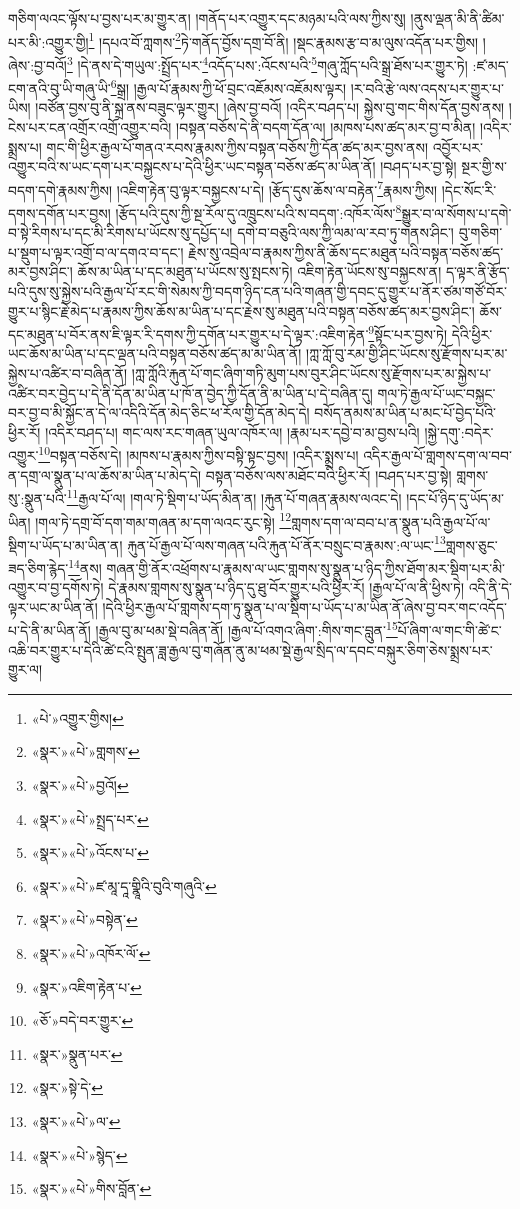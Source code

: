གཅིག་ལའང་ལྟོས་པ་བྱས་པར་མ་གྱུར་ན། །གནོད་པར་འགྱུར་དང་མཉམ་པའི་ལས་ཀྱིས་སུ། །ནུས་ལྡན་མི་ནི་ཚིམ་པར་མི་:འགྱུར་གྱི།\footnote{«པེ་»འགྱུར་གྱིས།} །དཔའ་བོ་ཀླགས་\footnote{«སྣར་»«པེ་»གླགས་}ཏེ་གནོད་བྱོས་དགྲ་བོ་ནི། །སྡང་རྣམས་རྩ་བ་མ་ལུས་འདོན་པར་གྱིས། །ཞེས་:བྱ་བའོ།\footnote{«སྣར་»«པེ་»བྱའོ།} །དེ་ནས་དེ་གཡུལ་:སྤྲོད་པར་\footnote{«སྣར་»«པེ་»སྤྲད་པར་}འདོད་པས་:འོངས་པའི་\footnote{«སྣར་»«པེ་»འོངས་པ་}གཞུ་ཀློད་པའི་སྒྲ་ཐོས་པར་གྱུར་ཏེ། :ཛ་མད་ངག་ནའི་བུ་ཡི་གཞུ་ཡི་\footnote{«སྣར་»«པེ་»ཛ་མཱ་དཱ་གྣཱིའི་བུའི་གཞུའི་}སྒྲ། །རྒྱལ་པོ་རྣམས་ཀྱི་ཕོ་བྲང་འཇོམས་འཇོམས་ལྟར། །ར་བའི་རྩེ་ལས་འདས་པར་གྱུར་པ་ཡིས། །བཙོན་བྱས་བུ་ནི་སྐྲ་ནས་བཟུང་ལྟར་གྱུར། །ཞེས་བྱ་བའོ། །འདིར་བཤད་པ། སྐྱེས་བུ་གང་གིས་དོན་བྱས་ནས། །ངེས་པར་ངན་འགྲོར་འགྲོ་འགྱུར་བའི། །བསྟན་བཅོས་དེ་ནི་བདག་དོན་ལ། །མཁས་པས་ཚད་མར་བྱ་བ་མིན། །འདིར་སྨྲས་པ། གང་གི་ཕྱིར་རྒྱལ་པོ་གནའ་རབས་རྣམས་ཀྱིས་བསྟན་བཅོས་ཀྱི་དོན་ཚད་མར་བྱས་ནས། འབྱོར་པར་འགྱུར་བའི་ས་ཡང་དག་པར་བསྐྱངས་པ་དེའི་ཕྱིར་ཡང་བསྟན་བཅོས་ཚད་མ་ཡིན་ནོ། །བཤད་པར་བྱ་སྟེ། སྔར་གྱི་ས་བདག་དགེ་རྣམས་ཀྱིས། །འཇིག་རྟེན་བུ་ལྟར་བསྐྱངས་པ་དེ། །རྩོད་དུས་ཆོས་ལ་བརྟེན་\footnote{«སྣར་»«པེ་»བསྟེན་}རྣམས་ཀྱིས། །དེང་སོང་རི་དགས་དགོན་པར་བྱས། །རྩོད་པའི་དུས་ཀྱི་སྔ་རོལ་དུ་འཁྲུངས་པའི་ས་བདག་:འཁོར་ལོས་\footnote{«སྣར་»«པེ་»འཁོར་ལོ་}སྒྱུར་བ་ལ་སོགས་པ་དགེ་བ་སྟེ་རིགས་པ་དང་མི་རིགས་པ་ཡོངས་སུ་དཔྱོད་པ། དགེ་བ་བཅུའི་ལས་ཀྱི་ལམ་ལ་རབ་ཏུ་གནས་ཤིང་། བུ་གཅིག་པ་སྡུག་པ་ལྟར་འགྲོ་བ་ལ་དགའ་བ་དང་། རྗེས་སུ་འབྲེལ་བ་རྣམས་ཀྱིས་ནི་ཆོས་དང་མཐུན་པའི་བསྟན་བཅོས་ཚད་མར་བྱས་ཤིང་། ཆོས་མ་ཡིན་པ་དང་མཐུན་པ་ཡོངས་སུ་སྤངས་ཏེ། འཇིག་རྟེན་ཡོངས་སུ་བསྐྱངས་ན། ད་ལྟར་ནི་རྩོད་པའི་དུས་སུ་སྐྱེས་པའི་རྒྱལ་པོ་རང་གི་སེམས་ཀྱི་བདག་ཉིད་ངན་པའི་གཞན་གྱི་དབང་དུ་གྱུར་པ་ནོར་ཙམ་གཙོ་བོར་གྱུར་པ་སྙིང་རྗེ་མེད་པ་རྣམས་ཀྱིས་ཆོས་མ་ཡིན་པ་དང་རྗེས་སུ་མཐུན་པའི་བསྟན་བཅོས་ཚད་མར་བྱས་ཤིང་། ཆོས་དང་མཐུན་པ་བོར་ནས་ཇི་ལྟར་རི་དགས་ཀྱི་དགོན་པར་གྱུར་པ་དེ་ལྟར་:འཇིག་རྟེན་\footnote{«སྣར་»འཇིག་རྟེན་པ་}སྟོང་པར་བྱས་ཏེ། དེའི་ཕྱིར་ཡང་ཆོས་མ་ཡིན་པ་དང་ལྡན་པའི་བསྟན་བཅོས་ཚད་མ་མ་ཡིན་ནོ། །ཀླ་ཀློ་བུ་རམ་གྱི་ཤིང་ཡོངས་སུ་རྫོགས་པར་མ་སྐྱེས་པ་འཚིར་བ་བཞིན་ནོ། །ཀླ་ཀློའི་རྐུན་པོ་གང་ཞིག་གཏི་མུག་པས་བུར་ཤིང་ཡོངས་སུ་རྫོགས་པར་མ་སྐྱེས་པ་འཚིར་བར་བྱེད་པ་དེ་ནི་དོན་མ་ཡིན་པ་ཁོ་ན་བྱེད་ཀྱི་དོན་ནི་མ་ཡིན་པ་དེ་བཞིན་དུ། གལ་ཏེ་རྒྱལ་པོ་ཡང་བསྐྱང་བར་བྱ་བ་མི་སྐྱོང་ན་དེ་ལ་འདིའི་དོན་མེད་ཅིང་ཕ་རོལ་གྱི་དོན་མེད་དེ། བསོད་ནམས་མ་ཡིན་པ་མང་པོ་བྱེད་པའི་ཕྱིར་རོ། །འདིར་བཤད་པ། གང་ལས་རང་གཞན་ཡུལ་འཁོར་ལ། །རྣམ་པར་དབྱེ་བ་མ་བྱས་པའི། །སྐྱེ་དགུ་:བདེར་འགྱུར་\footnote{«ཅོ་»བདེ་བར་གྱུར་}བསྟན་བཅོས་དེ། །མཁས་པ་རྣམས་ཀྱིས་བསྟི་སྟང་བྱས། །འདིར་སྨྲས་པ། འདིར་རྒྱལ་པོ་གླགས་དག་ལ་བབ་ན་དགྲ་ལ་སྣུན་པ་ལ་ཆོས་མ་ཡིན་པ་མེད་དེ། བསྟན་བཅོས་ལས་མཐོང་བའི་ཕྱིར་རོ། །བཤད་པར་བྱ་སྟེ། གླགས་སུ་:སྣུན་པའི་\footnote{«སྣར་»སྣུན་པར་}རྒྱལ་པོ་ལ། །གལ་ཏེ་སྡིག་པ་ཡོད་མིན་ན། །རྐུན་པོ་གཞན་རྣམས་ལའང་དེ། །དང་པོ་ཉིད་དུ་ཡོད་མ་ཡིན། །གལ་ཏེ་དགྲ་བོ་དག་གམ་གཞན་མ་དག་ལའང་རུང་སྟེ། \footnote{«སྣར་»སྟེ་དེ་}གླགས་དག་ལ་བབ་པ་ན་སྣུན་པའི་རྒྱལ་པོ་ལ་སྡིག་པ་ཡོད་པ་མ་ཡིན་ན། རྐུན་པོ་རྒྱལ་པོ་ལས་གཞན་པའི་རྐུན་པོ་ནོར་བསྲུང་བ་རྣམས་:ལ་ཡང་\footnote{«སྣར་»«པེ་»ལ་}གླགས་ཅུང་ཟད་ཅིག་རྙེད་\footnote{«སྣར་»«པེ་»སྙེད་}ནས། གཞན་གྱི་ནོར་འཕྲོགས་པ་རྣམས་ལ་ཡང་གླགས་སུ་སྣུན་པ་ཉིད་ཀྱིས་ཐོག་མར་སྡིག་པར་མི་འགྱུར་བ་བྱ་དགོས་ཏེ། དེ་རྣམས་གླགས་སུ་སྣུན་པ་ཉིད་དུ་ཐུ་བོར་གྱུར་པའི་ཕྱིར་རོ། །རྒྱལ་པོ་ལ་ནི་ཕྱིས་ཏེ། འདི་ནི་དེ་ལྟར་ཡང་མ་ཡིན་ནོ། །དེའི་ཕྱིར་རྒྱལ་པོ་གླགས་དག་ཏུ་སྣུན་པ་ལ་སྡིག་པ་ཡོད་པ་མ་ཡིན་ནོ་ཞེས་བྱ་བར་གང་འདོད་པ་དེ་ནི་མ་ཡིན་ནོ། །རྒྱལ་བུ་མ་ཕམ་སྡེ་བཞིན་ནོ། །རྒྱལ་པོ་འགའ་ཞིག་:གིས་གང་བླུན་\footnote{«སྣར་»«པེ་»གིས་བློན་}པོ་ཞིག་ལ་གང་གི་ཚེ་ང་འཆི་བར་གྱུར་པ་དེའི་ཚེ་ངའི་སྤུན་ཟླ་རྒྱལ་བུ་གཞོན་ནུ་མ་ཕམ་སྡེ་རྒྱལ་སྲིད་ལ་དབང་བསྐུར་ཅིག་ཅེས་སྨྲས་པར་གྱུར་ལ། 